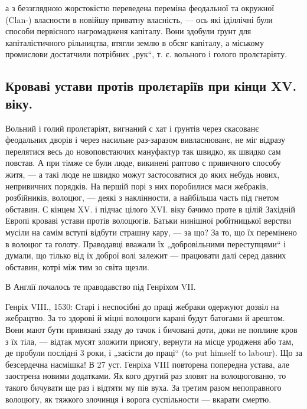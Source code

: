 \parcont{}
а з беззглядною жорстокістю переведена переміна феодальної та окружної (Clan-)
власности в новійшу приватну власність, — ось які іділлічні були способи
первісного нагромадженя капіталу. Вони здобули ґрунт для капіталістичного
рільництва, втягли землю в обсяг капіталу, а міському промислови
достатчили потрібних „рук“, т. є. вольного і голого пролєтаріяту.

\subsection{Кроваві устави протів пролєтаріїв при кінци XV. віку.}

Вольний і голий пролєтаріят, вигнаний с хат і ґрунтів
через скасованє феодальних дворів і через насильне раз-заразом
вивласнюванє, не міг відразу перелятися весь до
новоповстаючих мануфактур так швидко, як швидко сам
повстав. А при тімже се були люде, викинені раптово с привичного
способу житя, — а такі люде не швидко можут
застосоватися до яких небудь нових, непривичних порядків.
На першій порі з них поробилися маси жебраків, розбійників,
волоцюг, — деякі з наклінности, а найбільша часть під гнетом обставин. С
кінцем XV. і підчас цілого XVI. віку бачимо проте в цілій Західній Европі
кроваві устави протів волоцюгів. Батьки нинішної робітницької верстви мусіли
на самім вступі відбути страшну кару, — за що? За то, що їх перемінено в волоцюг
та голоту. Праводавці вважали їх „добровільними переступцями“ і думали, що
тілько від їх доброї волі залежит — працювати далі серед давних обставин, котрі
між тим зо світа щезли.

В Англії почалось те праводавство під Генріхом VII.

Генріх VIII., 1530: Старі і неспосібні до праці жебраки одержуют дозвіл на
жебрацтво. За то здорові й міцні волоцюги карані будут батогами й арештом. Вони
мают бути привязані ззаду до тачок і бичовані доти, доки не поплине кров з їх
тіла, — відтак мусят зложити присягу, вернути на місце уродженя або там, де
пробули послідні 3 роки, і „засісти до праці“ (to put himself to labour). Що за
безсердечна насмішка! В 27 уст. Генріха VIII повторена попередна устава, але
заострена новими додатками. Як кого другий раз зловят на волоцюгованю, то такого
бичувати ще раз і відтяти му пів вуха. За третим разом непоправного волоцюгу,
як тяжкого злочинця і ворога суспільности — вкарати смертю.


